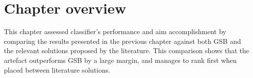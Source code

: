 \section{Chapter overview}
This chapter assessed classifier's performance and aim accomplishment by comparing the results presented in the previous chapter against both GSB and the relevant solutions proposed by the literature. This comparison shows that the artefact outperforms GSB by a large margin, and manages to rank first when placed between literature solutions.

